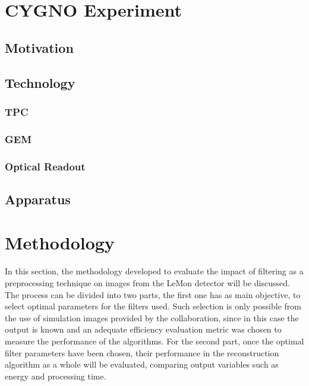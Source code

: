 \documentclass[
        oneside,      %
        english,			
        brazil			 
        ]{abntbibufjf}
\begin{document}






























\chapter{CYGNO Experiment}
\label{chap:cygnoexp}

\section{Motivation}

\section{Technology}
\subsection{TPC}
\subsection{GEM}
\subsection{Optical Readout}


\section{Apparatus}



\chapter{Methodology}
\label{chap:methodology}
In this section, the methodology developed to evaluate the impact of filtering as a preprocessing technique on images from the LeMon detector will be discussed. The process can be divided into two parts, the first one has as main objective, to select optimal parameters for the filters used. 
Such selection is only possible from the use of simulation images provided by the collaboration, since in this case the output is known and an adequate efficiency evaluation metric was chosen to measure the performance of the algorithms. For the second part, once the optimal filter parameters have been chosen, their performance in the reconstruction algorithm as a whole will be evaluated, comparing output variables such as energy and processing time. 
\end{document}
